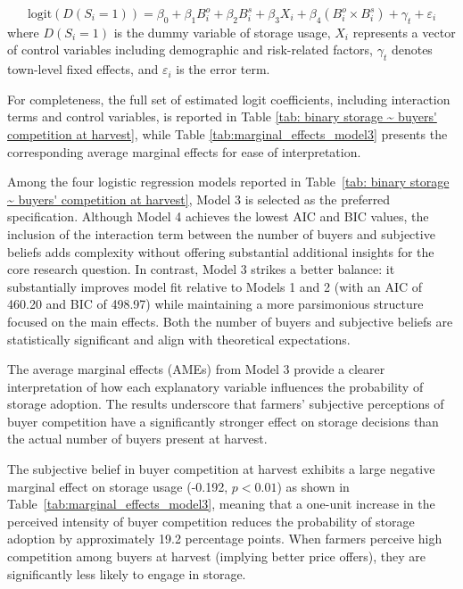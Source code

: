 \begin{equation}
\text{logit} \left( D(S_i= 1) \right) = \beta_0 + \beta_1 B^o_i + \beta_2 B^s_i + \beta_3 X_i + \beta_4 (B^o_i \times B^s_i) + \gamma_t + \varepsilon_i
\label{Eq: empirical first one}
\end{equation}
where $D(S_i=1)$ is the dummy variable of storage usage, $X_i$ represents a vector of control variables including demographic and risk-related factors, $\gamma_t$ denotes town-level fixed effects, and $\varepsilon_i$ is the error term.  




For completeness, the full set of estimated logit coefficients, including interaction terms and control variables, is reported in Table \ref{tab: binary storage ~ buyers' competition at harvest}, while Table \ref{tab:marginal_effects_model3} presents the corresponding average marginal effects for ease of interpretation.  

Among the four logistic regression models reported in Table~\ref{tab: binary storage ~ buyers' competition at harvest}, Model 3 is selected as the preferred specification. Although Model 4 achieves the lowest AIC and BIC values, the inclusion of the interaction term between the number of buyers and subjective beliefs adds complexity without offering substantial additional insights for the core research question. In contrast, Model 3 strikes a better balance: it substantially improves model fit relative to Models 1 and 2 (with an AIC of 460.20 and BIC of 498.97) while maintaining a more parsimonious structure focused on the main effects. Both the number of buyers and subjective beliefs are statistically significant and align with theoretical expectations.

The average marginal effects (AMEs) from Model 3 provide a clearer interpretation of how each explanatory variable influences the probability of storage adoption. The results underscore that farmers' subjective perceptions of buyer competition have a significantly stronger effect on storage decisions than the actual number of buyers present at harvest.  

The subjective belief in buyer competition at harvest exhibits a large negative marginal effect on storage usage (-0.192, $p<0.01$) as shown in Table~\ref{tab:marginal_effects_model3}, meaning that a one-unit increase in the perceived intensity of buyer competition reduces the probability of storage adoption by approximately 19.2 percentage points. When farmers perceive high competition among buyers at harvest (implying better price offers), they are significantly less likely to engage in storage.  


